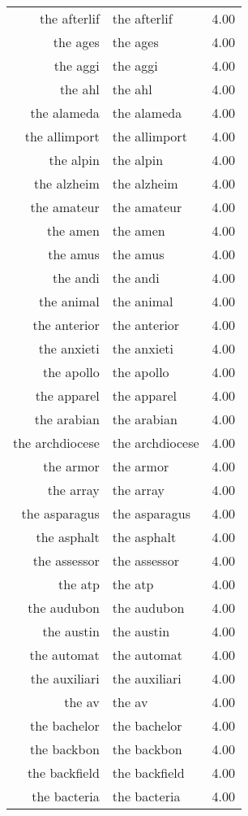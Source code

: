 \begin{table}[ht]
\begin{tabular}{rlr}
  the afterlif & the afterlif & 4.00 \\ 
  the ages & the ages & 4.00 \\ 
  the aggi & the aggi & 4.00 \\ 
  the ahl & the ahl & 4.00 \\ 
  the alameda & the alameda & 4.00 \\ 
  the allimport & the allimport & 4.00 \\ 
  the alpin & the alpin & 4.00 \\ 
  the alzheim & the alzheim & 4.00 \\ 
  the amateur & the amateur & 4.00 \\ 
  the amen & the amen & 4.00 \\ 
  the amus & the amus & 4.00 \\ 
  the andi & the andi & 4.00 \\ 
  the animal & the animal & 4.00 \\ 
  the anterior & the anterior & 4.00 \\ 
  the anxieti & the anxieti & 4.00 \\ 
  the apollo & the apollo & 4.00 \\ 
  the apparel & the apparel & 4.00 \\ 
  the arabian & the arabian & 4.00 \\ 
  the archdiocese & the archdiocese & 4.00 \\ 
  the armor & the armor & 4.00 \\ 
  the array & the array & 4.00 \\ 
  the asparagus & the asparagus & 4.00 \\ 
  the asphalt & the asphalt & 4.00 \\ 
  the assessor & the assessor & 4.00 \\ 
  the atp & the atp & 4.00 \\ 
  the audubon & the audubon & 4.00 \\ 
  the austin & the austin & 4.00 \\ 
  the automat & the automat & 4.00 \\ 
  the auxiliari & the auxiliari & 4.00 \\ 
  the av & the av & 4.00 \\ 
  the bachelor & the bachelor & 4.00 \\ 
  the backbon & the backbon & 4.00 \\ 
  the backfield & the backfield & 4.00 \\ 
  the bacteria & the bacteria & 4.00 \\ 

\end{tabular}
\end{table}

